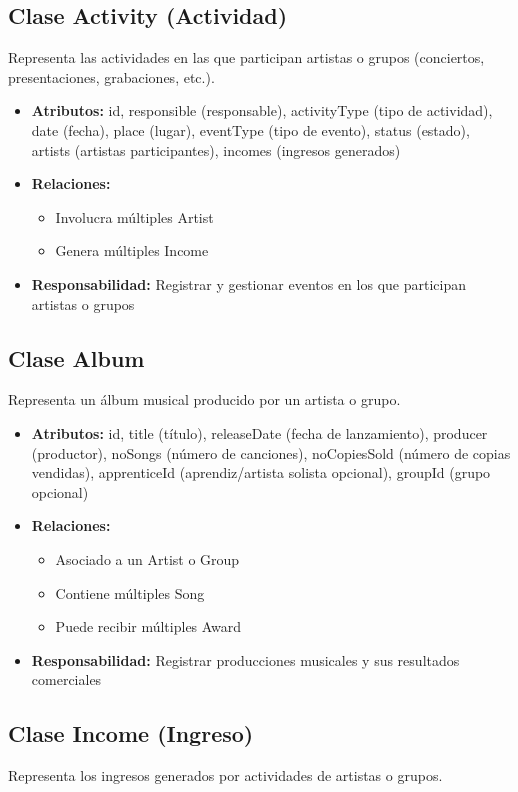 \documentclass[12pt,a4paper,spanish,oneside]{report}
\begin{document}
\subsection{Clase Activity (Actividad)}
Representa las actividades en las que participan artistas o grupos (conciertos, presentaciones, grabaciones, etc.).

\begin{itemize}
	\item \textbf{Atributos:} id, responsible (responsable), activityType (tipo de actividad), date (fecha), place (lugar), eventType (tipo de evento), status (estado), artists (artistas participantes), incomes (ingresos generados)
	\item \textbf{Relaciones:}
	\begin{itemize}
		\item Involucra múltiples Artist
		\item Genera múltiples Income
	\end{itemize}
	\item \textbf{Responsabilidad:} Registrar y gestionar eventos en los que participan artistas o grupos
\end{itemize}

\subsection{Clase Album}
Representa un álbum musical producido por un artista o grupo.

\begin{itemize}
	\item \textbf{Atributos:} id, title (título), releaseDate (fecha de lanzamiento), producer (productor), noSongs (número de canciones), noCopiesSold (número de copias vendidas), apprenticeId (aprendiz/artista solista opcional), groupId (grupo opcional)
	\item \textbf{Relaciones:}
	\begin{itemize}
		\item Asociado a un Artist o Group
		\item Contiene múltiples Song
		\item Puede recibir múltiples Award
	\end{itemize}
	\item \textbf{Responsabilidad:} Registrar producciones musicales y sus resultados comerciales
\end{itemize}

\subsection{Clase Income (Ingreso)}
Representa los ingresos generados por actividades de artistas o grupos.
\end{document}
